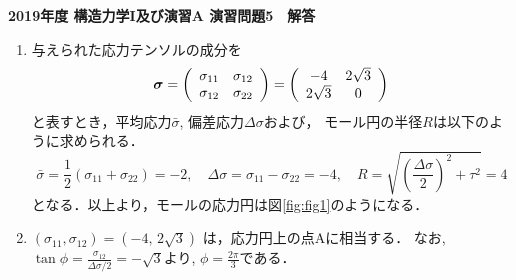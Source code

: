 \documentclass[10pt,a4j]{jarticle}
\newlength{\minitwocolumn}
\begin{document}
\newcommand{\fat}[1]{\mbox{\boldmath $#1$}}
\newcommand{\D}{\partial}
\newcommand{\w}{\omega}
\newcommand{\ga}{\alpha}
\newcommand{\gb}{\beta}
\newcommand{\gx}{\xi}
\newcommand{\gz}{\zeta}
\newcommand{\vhat}[1]{\hat{\fat{#1}}}
\newcommand{\spc}{\vspace{0.7\baselineskip}}
\newcommand{\halfspc}{\vspace{0.3\baselineskip}}

\pagestyle{empty}
\newcommand{\twofig}[2]
 {
   \begin{figure}[h]
     \begin{minipage}[t]{\minitwocolumn}
         \begin{center}   #1
         \end{center}
     \end{minipage}
         \hspace{\columnsep}
     \begin{minipage}[t]{\minitwocolumn}
         \begin{center} #2
         \end{center}
     \end{minipage}
   \end{figure}
 }
\begin{center}
{\Large \bf 2019年度 構造力学I及び演習A 演習問題5　解答} \\
\end{center}
\vspace{15mm}
\begin{enumerate}
\item
与えられた応力テンソルの成分を
\begin{equation}
	\fat{\sigma}
	=
	\left( 
		\begin{array}{cc}
		\sigma_{11} & \sigma_{12} \\
		\sigma_{12} & \sigma_{22} 
		\end{array}
	\right)
	=
	\left( 
		\begin{array}{cc}
			-4 & 2\sqrt{3} \\
			2\sqrt{3} & 0 
		\end{array}
	\right)
	\label{eqn:sigma_given}
\end{equation}
と表すとき，平均応力$\bar{\sigma}$, 偏差応力$\Delta \sigma$および，
モール円の半径$R$は以下のように求められる．
\begin{equation}
	\bar{\sigma} 
	= \frac{1}{2}\left({ \sigma_{11} + \sigma_{22} }\right) = -2,
	\quad
	\Delta \sigma = \sigma_{11} - \sigma_{22} = -4,
	\quad
	R = \sqrt{\left({ \frac{\Delta \sigma}{2} }\right)^2 + \tau^2 } 
	=4 
\end{equation}
となる．以上より，モールの応力円は図\ref{fig:fig1}のようになる．

\item
$\left(\sigma_{11}, \sigma_{12}\right)=\left(-4, \, 2\sqrt{3} \right)$
は，応力円上の点Aに相当する．
		なお,$\tan \phi = \frac{\sigma_{12}}{\Delta \sigma/2}=-\sqrt{3}$より, 
$\phi=\frac{2\pi}{3}$である．
\end{enumerate}
\end{document}
